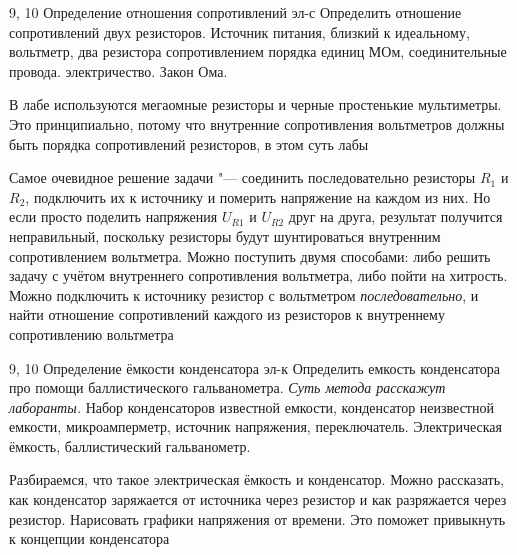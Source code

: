 \begin{enumerate}
		{9, 10}
		{Определение отношения сопротивлений}
		{эл-с}
		{Определить отношение сопротивлений двух резисторов.}
		{Источник питания, близкий к идеальному, вольтметр, два резистора сопротивлением порядка единиц МОм, соединительные провода.}
		{электричество. Закон Ома.}
		{\item В лабе используются мегаомные резисторы и черные простенькие мультиметры. Это принципиально, потому что внутренние сопротивления вольтметров должны быть порядка сопротивлений резисторов, в этом суть лабы
        \item Самое очевидное решение задачи "--- соединить последовательно резисторы $R_1$ и $R_2$, подключить их к источнику и померить напряжение на каждом из них. Но если просто поделить напряжения $U_{R1}$ и $U_{R2}$ друг на друга, результат получится неправильный, поскольку резисторы будут шунтироваться внутренним сопротивлением вольтметра. Можно поступить двумя способами: либо решить задачу с учётом внутреннего сопротивления вольтметра, либо пойти на хитрость. Можно подключить к источнику резистор с вольтметром \textit{последовательно}, и найти отношение сопротивлений каждого из резисторов к внутреннему сопротивлению вольтметра}
	\item \labtitle
		{9, 10}
		{Определение ёмкости конденсатора}
		{эл-к}
		{Определить емкость конденсатора про помощи баллистического гальванометра. \textit{Суть метода расскажут лаборанты.}}
		{Набор конденсаторов известной емкости, конденсатор неизвестной емкости, микроамперметр, источник напряжения, переключатель.}
		{Электрическая ёмкость, баллистический гальванометр.}
		{\item Разбираемся, что такое электрическая ёмкость и конденсатор. Можно рассказать, как конденсатор заряжается от источника через резистор и как разряжается через резистор. Нарисовать графики напряжения от времени. Это поможет привыкнуть к концепции конденсатора

}
\end{enumerate}
